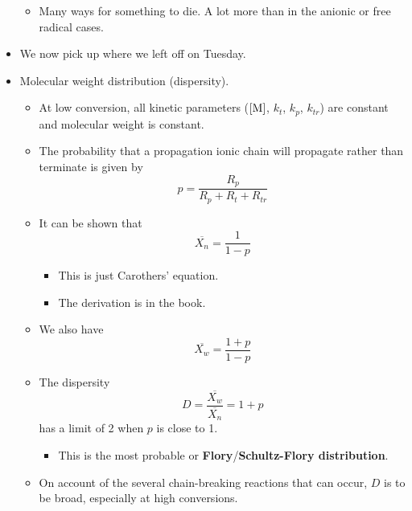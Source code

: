 \documentclass[../notes.tex]{subfiles}
\begin{document}
\begin{itemize}
\begin{itemize}
\begin{itemize}
        \end{itemize}
        \item Many ways for something to die. A lot more than in the anionic or free radical cases.
    \end{itemize}
    \item We now pick up where we left off on Tuesday.
    \item Molecular weight distribution (dispersity).
    \begin{itemize}
        \item At low conversion, all kinetic parameters ($[\ce{M}]$, $k_t$, $k_p$, $k_{tr}$) are constant and molecular weight is constant.
        \item The probability that a propagation ionic chain will propagate rather than terminate is given by
        \begin{equation*}
            p = \frac{R_p}{R_p+R_t+R_{tr}}
        \end{equation*}
        \item It can be shown that
        \begin{equation*}
            \overline{X_n} = \frac{1}{1-p}
        \end{equation*}
        \begin{itemize}
            \item This is just Carothers' equation.
            \item The derivation is in the book.
        \end{itemize}
        \item We also have
        \begin{equation*}
            \overline{X_w} = \frac{1+p}{1-p}
        \end{equation*}
        \item The dispersity
        \begin{equation*}
            D = \frac{\overline{X_w}}{\overline{X_n}} = 1+p
        \end{equation*}
        has a limit of 2 when $p$ is close to 1.
        \begin{itemize}
            \item This is the most probable or \textbf{Flory}/\textbf{Schultz-Flory distribution}.
        \end{itemize}
        \item On account of the several chain-breaking reactions that can occur, $D$ is to be broad, especially at high conversions.
    \end{itemize}

\end{itemize}
\end{document}
